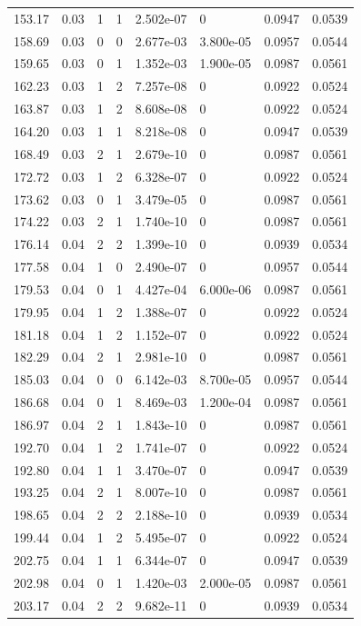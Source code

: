 \documentclass[preview]{standalone}
\begin{document}
{{{\begin{tabular}{L{1.2cm}C{1.2cm} C{0.3cm}C{0.5cm} C{1.4cm}C{1.4cm} C{1.4cm}C{1.4cm}}
  153.17  &  0.03  & 1     &  1 &  2.502e-07  & 0  & 0.0947 &  0.0539   \\ 
  158.69  &  0.03  & 0     &  0 &  2.677e-03  & 3.800e-05  & 0.0957 &  0.0544   \\ 
  159.65  &  0.03  & 0     &  1 &  1.352e-03  & 1.900e-05  & 0.0987 &  0.0561   \\ 
  162.23  &  0.03  & 1     &  2 &  7.257e-08  & 0  & 0.0922 &  0.0524   \\ 
  163.87  &  0.03  & 1     &  2 &  8.608e-08  & 0  & 0.0922 &  0.0524   \\ 
  164.20  &  0.03  & 1     &  1 &  8.218e-08  & 0  & 0.0947 &  0.0539   \\ 
  168.49  &  0.03  & 2     &  1 &  2.679e-10  & 0  & 0.0987 &  0.0561   \\ 
  172.72  &  0.03  & 1     &  2 &  6.328e-07  & 0  & 0.0922 &  0.0524   \\ 
  173.62  &  0.03  & 0     &  1 &  3.479e-05  & 0  & 0.0987 &  0.0561   \\ 
  174.22  &  0.03  & 2     &  1 &  1.740e-10  & 0  & 0.0987 &  0.0561   \\ 
  176.14  &  0.04  & 2     &  2 &  1.399e-10  & 0  & 0.0939 &  0.0534   \\ 
  177.58  &  0.04  & 1     &  0 &  2.490e-07  & 0  & 0.0957 &  0.0544   \\ 
  179.53  &  0.04  & 0     &  1 &  4.427e-04  & 6.000e-06  & 0.0987 &  0.0561   \\ 
  179.95  &  0.04  & 1     &  2 &  1.388e-07  & 0  & 0.0922 &  0.0524   \\ 
  181.18  &  0.04  & 1     &  2 &  1.152e-07  & 0  & 0.0922 &  0.0524   \\ 
  182.29  &  0.04  & 2     &  1 &  2.981e-10  & 0  & 0.0987 &  0.0561   \\ 
  185.03  &  0.04  & 0     &  0 &  6.142e-03  & 8.700e-05  & 0.0957 &  0.0544   \\ 
  186.68  &  0.04  & 0     &  1 &  8.469e-03  & 1.200e-04  & 0.0987 &  0.0561   \\ 
  186.97  &  0.04  & 2     &  1 &  1.843e-10  & 0  & 0.0987 &  0.0561   \\ 
  192.70  &  0.04  & 1     &  2 &  1.741e-07  & 0  & 0.0922 &  0.0524   \\ 
  192.80  &  0.04  & 1     &  1 &  3.470e-07  & 0  & 0.0947 &  0.0539   \\ 
  193.25  &  0.04  & 2     &  1 &  8.007e-10  & 0  & 0.0987 &  0.0561   \\ 
  198.65  &  0.04  & 2     &  2 &  2.188e-10  & 0  & 0.0939 &  0.0534   \\ 
  199.44  &  0.04  & 1     &  2 &  5.495e-07  & 0  & 0.0922 &  0.0524   \\ 
  202.75  &  0.04  & 1     &  1 &  6.344e-07  & 0  & 0.0947 &  0.0539   \\ 
  202.98  &  0.04  & 0     &  1 &  1.420e-03  & 2.000e-05  & 0.0987 &  0.0561   \\ 
  203.17  &  0.04  & 2     &  2 &  9.682e-11  & 0  & 0.0939 &  0.0534   \\ 
\hline 
\end{tabular} 

}}}
\end{document}

